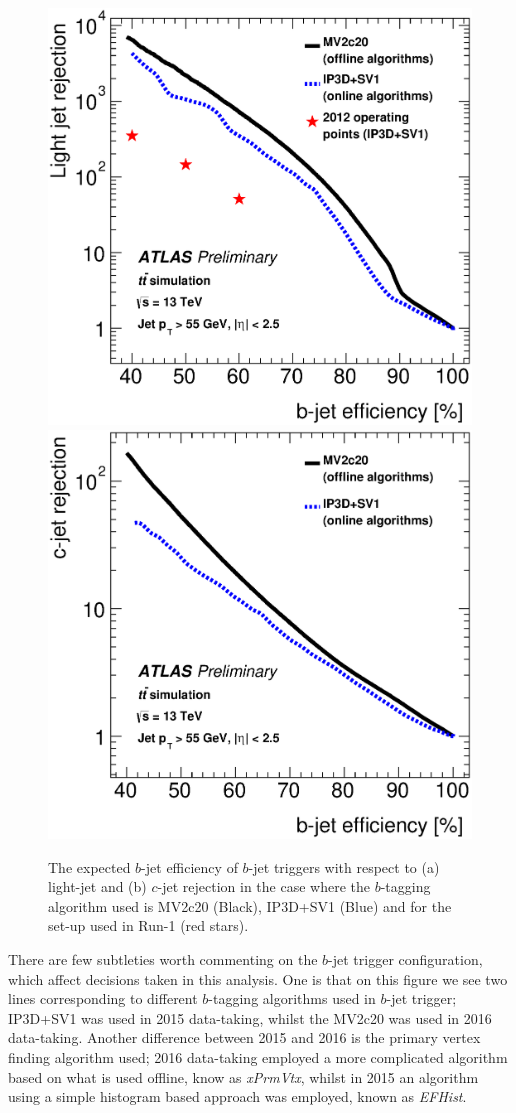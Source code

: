 \begin{figure}[!ht]
  \begin{center}
    \includegraphics[width=0.48\linewidth, angle=0]{figs/Trigger/trig-bTrig_perf_light.eps}
    \includegraphics[width=0.48\linewidth, angle=0]{figs/Trigger/trig-bTrig_perf_charm.eps}
  \end{center}
  \caption{The expected $b$-jet efficiency of $b$-jet triggers with respect to (a) light-jet and (b) $c$-jet rejection
    in the case where the $b$-tagging algorithm used is MV2c20 (Black), IP3D+SV1 (Blue) and for the set-up used in Run-1 (red stars).}
  \label{fig:trig-bTrig_perf}
\end{figure}

There are few subtleties worth commenting on the $b$-jet trigger configuration, which affect decisions taken in this analysis.
One is that on this figure we see two lines corresponding to different $b$-tagging algorithms used in $b$-jet trigger;
IP3D+SV1 was used in 2015 data-taking,
whilst the MV2c20 was used in 2016 data-taking.
Another difference between 2015 and 2016 is the primary vertex finding algorithm used;
2016 data-taking employed a more complicated algorithm based on what is used offline, know as \textit{xPrmVtx},
whilst in 2015 an algorithm using a simple histogram based approach was employed, known as \textit{EFHist}. \\

